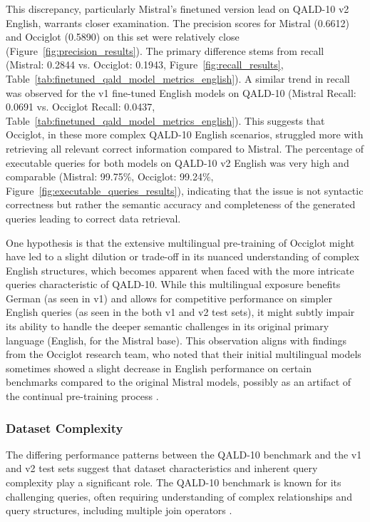 This discrepancy, particularly Mistral's finetuned version lead on QALD-10 v2 English, warrants closer examination. 
The precision scores for Mistral (0.6612) and Occiglot (0.5890) on this set were relatively close (Figure~\ref{fig:precision_results}). 
The primary difference stems from recall (Mistral: 0.2844 vs. Occiglot: 0.1943, Figure~\ref{fig:recall_results}, Table~\ref{tab:finetuned_qald_model_metrics_english}).
A similar trend in recall was observed for the v1 fine-tuned English models on QALD-10 (Mistral Recall: 0.0691 vs. Occiglot Recall: 0.0437, Table~\ref{tab:finetuned_qald_model_metrics_english}). 
This suggests that Occiglot, in these more complex QALD-10 English scenarios, struggled more with retrieving all relevant correct information compared to Mistral. 
The percentage of executable queries for both models on QALD-10 v2 English was very high and comparable (Mistral: 99.75\%, Occiglot: 99.24\%, Figure~\ref{fig:executable_queries_results}), indicating that the issue is not syntactic correctness but rather the semantic accuracy and completeness of the generated queries leading to correct data retrieval.

One hypothesis is that the extensive multilingual pre-training of Occiglot might have led to a slight dilution or trade-off in its nuanced understanding of complex English structures, which becomes apparent when faced with the more intricate queries characteristic of QALD-10.
While this multilingual exposure benefits German (as seen in v1) and allows for competitive performance on simpler English queries (as seen in the both v1 and v2 test sets), it might subtly impair its ability to handle the deeper semantic challenges in its original primary language (English, for the Mistral base). 
This observation aligns with findings from the Occiglot research team, who noted that their initial multilingual models sometimes showed a slight decrease in English performance on certain benchmarks compared to the original Mistral models, possibly as an artifact of the continual pre-training process \cite{OcciglotResearchCollective2024Occiglot7BEU5Instruct,avramidis-etal-2024-occiglot}.

\subsubsection{Dataset Complexity}

The differing performance patterns between the QALD-10 benchmark and the v1 and v2 test sets suggest that dataset characteristics and inherent query complexity play a significant role. 
The QALD-10 benchmark is known for its challenging queries, often requiring understanding of complex relationships and query structures, including multiple join operators \cite{usbeck2024qald}.

